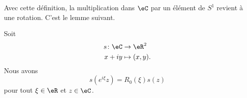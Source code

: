 Avec cette définition, la multiplication dans \( \eC\) par un élément de \( S^1\) revient à une rotation. C'est le lemme suivant.
\begin{lemma}        \label{LEMooUFOHooWdgIvO}
	Soit
	\begin{equation}
		\begin{aligned}
			s\colon \eC & \to \eR^2      \\
			x+iy        & \mapsto (x,y).
		\end{aligned}
	\end{equation}
	Nous avons
	\begin{equation}
		s( e^{i\xi}z)=R_0(\xi)s(z)
	\end{equation}
	pour tout \( \xi\in \eR\) et \( z\in \eC\).
\end{lemma}

